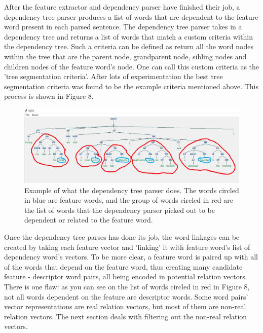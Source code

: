 \documentclass{sig-alternate}
\begin{document}
After the feature extractor and dependency parser have finished their job, a dependency tree parser produces a list of words that are dependent to the feature word present in each parsed sentence. The dependency tree parser takes in a dependency tree and returns a list of words that match a custom criteria within the dependency tree. Such a criteria can be defined as return all the word nodes within the tree that are the parent node, grandparent node, sibling nodes and children nodes of the feature word's node. One can call this custom criteria as the 'tree segmentation criteria'. After lots of experimentation the best tree segmentation criteria was found to be the example criteria mentioned above. This process is shown in Figure 8. 

\begin{figure}
\centering
\includegraphics[scale=0.25]{images/dep_tree_parsing.JPG}
\caption{Example of what the dependency tree parser does. The words circled in blue are feature words, and the group of words circled in red are the list of words that the dependency parser picked out to be dependent or related to the feature word.}
\end{figure}

Once the dependency tree parses has done its job, the word linkages can be created by taking each feature vector and 'linking' it with feature word's list of dependency word's vectors. To be more clear, a feature word is paired up with all of the words that depend on the feature word, thus creating many candidate feature - descriptor word pairs, all being encoded in potential relation vectors. There is one flaw: as you can see on the list of words circled in red in Figure 8, not all words dependent on the feature are descriptor words. Some word pairs' vector representations are real relation vectors, but most of them are non-real relation vectors. The next section deals with filtering out the non-real relation vectors.
\end{document}
